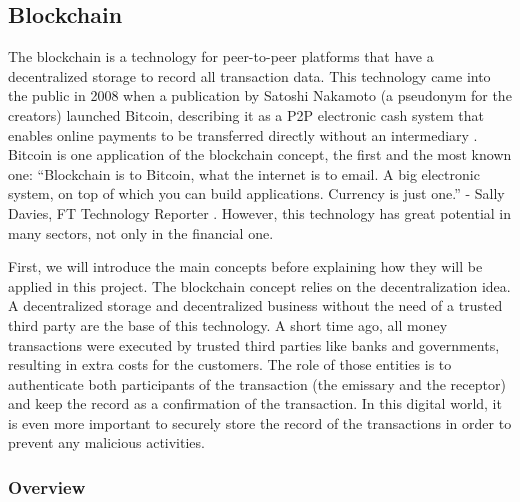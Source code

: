 \subsection{Blockchain}

The blockchain is a technology for peer-to-peer platforms that have a decentralized storage to record all transaction data. This technology came into the public in 2008  when a publication by Satoshi Nakamoto (a pseudonym for the creators)  launched Bitcoin, describing it as a \ac{P2P} electronic cash system that enables online payments to be transferred directly without an intermediary \cite{bitcoin}. Bitcoin is one application of the blockchain concept, the first and the most known one:  “Blockchain is to Bitcoin, what the internet is to email. A big electronic system, on top of which you can build applications. Currency is just one.” - Sally Davies, FT Technology Reporter \cite{Howbitcoinanditsblockchainwork}. However, this technology has great potential in many sectors, not only in the financial one.


First, we will introduce the main concepts before explaining how they will be applied in this project. The blockchain concept relies on the decentralization idea. A decentralized storage and decentralized business without the need of a trusted third party are the base of this technology. A short time ago, all money transactions were executed by trusted third parties like banks and governments, resulting in extra costs for the customers. The role of those entities is to authenticate both participants of the transaction (the emissary and the receptor) and keep the record as a confirmation of the transaction. In this digital world, it is even more important to securely store the record of the transactions in order to prevent any malicious activities. 



\subsubsection{Overview}


